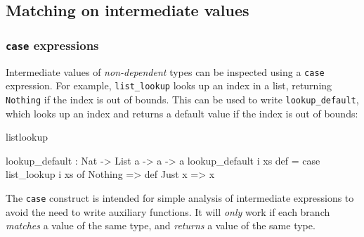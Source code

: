 \subsection{Matching on intermediate values}

%
%
%
%
%
%
%
%
%

\subsubsection{\texttt{case} expressions}

Intermediate values of \emph{non-dependent} types can be inspected using a
\texttt{case} expression.  For example, \texttt{list\_lookup} looks up an index
in a list, returning \texttt{Nothing} if the index is out of bounds. This can
be used to write \texttt{lookup\_default}, which looks up an index and
returns a default value if the index is out of bounds:

\begin{SaveVerbatim}{listlookup}

lookup_default : Nat -> List a -> a -> a
lookup_default i xs def = case list_lookup i xs of
                              Nothing => def
                              Just x => x

\end{SaveVerbatim}

The \texttt{case} construct is intended for simple analysis of intermediate
expressions to avoid the need to write auxiliary functions.  It will
\emph{only} work if each branch \emph{matches} a value of the same type, and
\emph{returns} a value of the same type.

